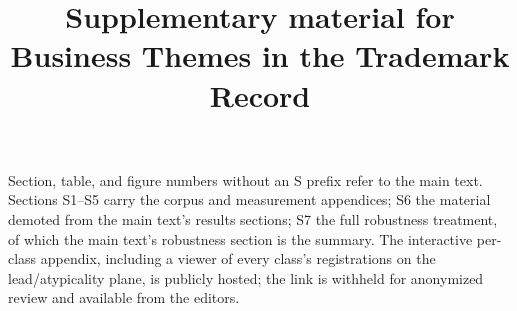 
\graphicspath{{../../}}
\makeatletter{}\makeatother
\usepackage{xr}

\renewcommand{\thesection}{S\arabic{section}}
\setcounter{secnumdepth}{2}
\renewcommand{\thetable}{S\arabic{table}}
\renewcommand{\thefigure}{S\arabic{figure}}

\title{\bfseries Supplementary material for\\
\large Business Themes in the Trademark Record}
\author{}
\date{}


\maketitle

\noindent Section, table, and figure numbers without an S prefix refer to
the main text. Sections S1--S5 carry the corpus and measurement
appendices; S6 the material demoted from the main text's results
sections; S7 the full robustness treatment, of which the main text's
robustness section is the summary. The interactive per-class appendix,
including a viewer of every class's registrations on the
lead/atypicality plane, is publicly hosted; the link is withheld for
anonymized review and available from the editors.







